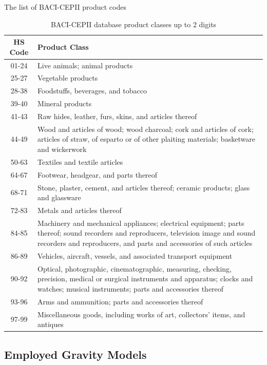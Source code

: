 \documentclass[preprint, 3p,
authoryear]{elsarticle} %
\begin{document}
The list of BACI-CEPII product codes

\begin{table}[H]
\centering
\caption{BACI-CEPII database product classes up to 2 digits}
\label{tab:BACIPROD}
\begin{tabular}{c|p{10cm}}
\hline
\toprule
{HS Code} & {Product Class} \\ \midrule
01-24 & Live animals; animal products \\
25-27 & Vegetable products \\
28-38 & Foodstuffs, beverages, and tobacco \\
39-40 & Mineral products \\
41-43 & Raw hides, leather, furs, skins, and articles thereof \\
44-49 & Wood and articles of wood; wood charcoal; cork and articles of cork; articles of straw, of esparto or of other plaiting materials; basketware and wickerwork \\
50-63 & Textiles and textile articles \\
64-67 & Footwear, headgear, and parts thereof \\
68-71 & Stone, plaster, cement, and articles thereof; ceramic products; glass and glassware \\
72-83 & Metals and articles thereof \\
84-85 & Machinery and mechanical appliances; electrical equipment; parts thereof; sound recorders and reproducers, television image and sound recorders and reproducers, and parts and accessories of such articles \\
86-89 & Vehicles, aircraft, vessels, and associated transport equipment \\
90-92 & Optical, photographic, cinematographic, measuring, checking, precision, medical or surgical instruments and apparatus; clocks and watches; musical instruments; parts and accessories thereof \\
93-96 & Arms and ammunition; parts and accessories thereof \\
97-99 & Miscellaneous goods, including works of art, collectors' items, and antiques \\

\bottomrule
\end{tabular}
\end{table}

\subsection{Employed Gravity Models}\label{sec:calcgrav}
\end{document}
